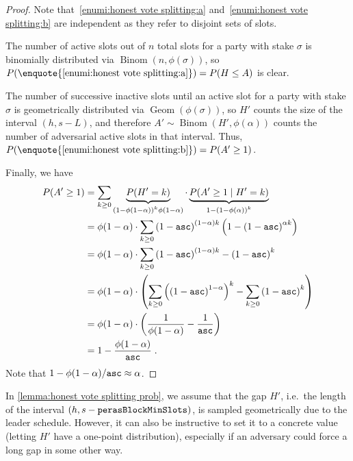 \begin{proof}
  Note that~\ref{enumi:honest vote splitting:a} and~\ref{enumi:honest vote splitting:b} are independent as they refer to disjoint sets of slots.

  The number of active slots out of $n$ total slots for a party with stake $\sigma$ is binomially distributed via $\operatorname{Binom}(n,\phi(\sigma))$, so $P(\enquote{\ref{enumi:honest vote splitting:a}}) = P(H\le A)$ is clear.

  The number of successive inactive slots until an active slot for a party with stake $\sigma$ is geometrically distributed via $\operatorname{Geom}(\phi(\sigma))$, so $H'$ counts the size of the interval $(h,s-L)$, and therefore $A' \sim \operatorname{Binom}(H',\phi(\alpha))$ counts the number of adversarial active slots in that interval.
  Thus, $P(\enquote{\ref{enumi:honest vote splitting:b}}) = P(A'\ge 1)$.

  Finally, we have
  \begin{align*}
    P(A' \ge 1) &= \sum_{k\ge 0} \underbrace{P(H' = k)}_{{(1-\phi(1-\alpha))}^k \phi(1-\alpha)} \cdot \underbrace{P(A' \ge 1 \mid H' = k)}_{1-{(1-\phi(\alpha))}^k} \\
                &= \phi(1-\alpha)\cdot \sum_{k\ge 0} {(1-\mathtt{asc})}^{(1-\alpha)k} \left( 1- {(1-\mathtt{asc})}^{\alpha k} \right) \\
                &= \phi(1-\alpha)\cdot\sum_{k\ge 0} {(1-\mathtt{asc})}^{(1-\alpha)k} - {(1-\mathtt{asc})}^k \\
                &= \phi(1-\alpha)\cdot \left(\sum_{k\ge 0} {\left({(1-\mathtt{asc})}^{1-\alpha}\right)}^k - \sum_{k\ge 0} {(1-\mathtt{asc})}^k \right) \\
                &= \phi(1-\alpha)\cdot \left( \frac1{\phi(1-\alpha)} - \frac1{\mathtt{asc}} \right) \\
                &= 1 - \frac{\phi(1-\alpha)}{\mathtt{asc}} \;.
  \end{align*}
  Note that $1-\phi(1-\alpha) / \mathtt{asc} \approx \alpha$.
\end{proof}

In \cref{lemma:honest vote splitting prob}, we assume that the gap $H'$, i.e.\ the length of the interval $(h,s-\mathtt{perasBlockMinSlots})$, is sampled geometrically due to the leader schedule.
However, it can also be instructive to set it to a concrete value (letting $H'$ have a one-point distribution), especially if an adversary could force a long gap in some other way.


